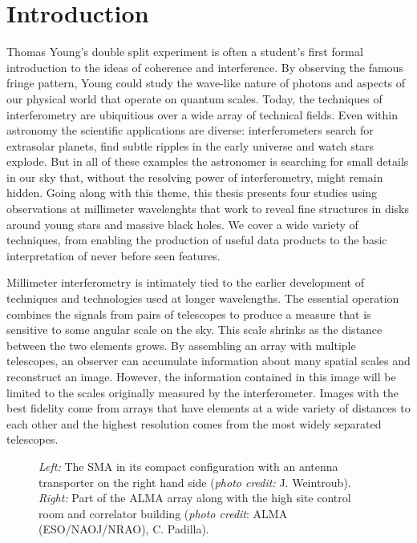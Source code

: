 \chapter{Introduction}\label{chapter:introduction}

Thomas Young's double split experiment is often a student's first formal introduction to the ideas of 
coherence and interference.  By observing the famous fringe pattern, Young could study the wave-like nature of 
photons and aspects of our physical world that operate on quantum scales.  Today, the techniques of interferometry
are ubiquitious over a wide array of technical fields.  Even within astronomy the scientific applications are 
diverse: interferometers  search for extrasolar planets, find subtle ripples in the early universe and watch 
stars explode.  But in all of these examples the astronomer is searching for small details in our sky that, 
without the resolving power of interferometry, might remain hidden.  Going along with this theme, this thesis 
presents four studies using observations at millimeter wavelenghts that work to reveal fine structures in disks 
around young stars and massive black holes.  We cover a wide variety of techniques, from enabling the production 
of useful data products to the basic interpretation of never before seen features.

Millimeter interferometry is intimately tied to the earlier development of techniques and technologies 
used at longer wavelengths.  The essential operation combines the signals from pairs of telescopes to produce a 
measure that is sensitive to some angular scale on the sky.  This scale shrinks as the distance
between the two elements grows.  By assembling an array with multiple 
telescopes, an observer can accumulate information about many spatial scales and reconstruct an image.  However,
the information contained in this image will be limited to the scales originally measured by the interferometer.
Images with the best fidelity come from arrays that have elements at a wide variety of 
distances to each other and the highest resolution comes from the most widely separated telescopes.

\begin{figure}[t!]
\caption{{\it Left:} The SMA in its compact configuration with an antenna transporter on the right hand side 
({\it photo credit:} J. Weintroub).  {\it Right:} Part of the ALMA array along with the high site control room and correlator building ({\it photo credit}: ALMA (ESO/NAOJ/NRAO), C. Padilla).}
\label{fig:sma_alma}
\end{figure}

